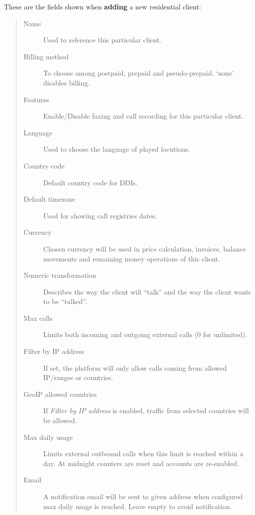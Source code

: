 \documentclass[letterpaper,10pt,spanish]{sphinxmanual}
\begin{document}
These are the fields shown when \textbf{adding} a new residential client:
\begin{quote}
\begin{description}
\item[{Name}] \leavevmode
Used to reference this particular client.

\item[{Billing method}] \leavevmode
To choose among postpaid, prepaid and pseudo-prepaid. `none' disables billing.

\item[{Features}] \leavevmode
Enable/Disable faxing and call recording for this particular client.

\item[{Language}] \leavevmode
Used to choose the language of played locutions.

\item[{Country code}] \leavevmode
Default country code for DDIs.

\item[{Default timezone}] \leavevmode
Used for showing call registries dates.

\item[{Currency}] \leavevmode
Chosen currency will be used in price calculation, invoices, balance movements and
remaining money operations of this client.

\item[{Numeric transformation}] \leavevmode
Describes the way the client will ``talk'' and the way the client wants to be ``talked''.

\item[{Max calls}] \leavevmode
Limits both incoming and outgoing external calls (0 for unlimited).

\item[{Filter by IP address}] \leavevmode
If set, the platform will only allow calls coming from allowed IP/ranges or countries.

\item[{GeoIP allowed countries}] \leavevmode
If \emph{Filter by IP address} is enabled, traffic from selected countries will be allowed.

\item[{Max daily usage}] \leavevmode
Limits external outbound calls when this limit is reached within a day. At midnight counters are reset and
accounts are re-enabled.

\item[{Email}] \leavevmode
A notification email will be sent to given address when configured max daily usage is reached. Leave empty to
avoid notification.

\end{description}
\end{quote}
\end{document}
